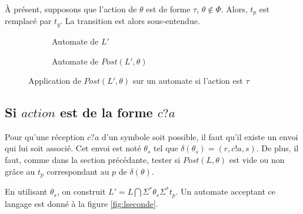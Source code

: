 À présent, supposons que l'action de $\theta$ est de forme $\tau$, $\theta\notin\Phi$. Alors, $t_p$ est remplacé par $t_q$. La transition est alors sous-entendue.

\begin{figure}[H]
    \centering
    \begin{subfigure}{0.5\linewidth}
        \centering
        \caption{Automate de $L'$}
    \end{subfigure}\hfill
    \begin{subfigure}{0.5\linewidth}
        \centering
        \caption{Automate de $Post(L',\theta)$}
    \end{subfigure}
    \caption{Application de $Post(L',\theta)$ sur un automate si l'action est $\tau$}
\end{figure}


\subsection{Si $action$ est de la forme $c?a$}

Pour qu'une réception $c?a$ d'un symbole soit possible, il faut qu'il existe un envoi qui lui soit associé. Cet envoi est noté $\theta_s$ tel que $\delta(\theta_s)=(r,c!a,s)$. De plus, il faut, comme dans la section précédante, tester si $Post(L,\theta)$ est vide ou non grâce au $t_p$ correspondant au $p$ de $\delta(\theta)$.

En utilisant $\theta_s$, on construit $L'=L\bigcap\Sigma^*\theta_s\Sigma^*t_p$. Un automate acceptant ce langage est donné à la figure \ref{fig:lseconde}.


